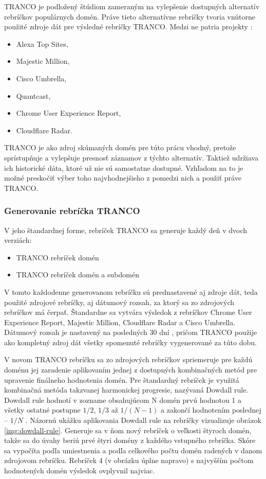 TRANCO je podložený štúdiom zameraným na vylepšenie dostupných alternatív rebríčkov populárnych domén.
Práve tieto alternatívne rebríčky tvoria vnútorne použité zdroje dát pre výsledné rebríčky TRANCO.
Medzi ne patria projekty \cite{tranco-config}:
\begin{itemize}
    \item Alexa Top Sites,
    \item Majestic Million,
    \item Cisco Umbrella,
    \item Quantcast,
    \item Chrome User Experience Report,
    \item Cloudflare Radar.
\end{itemize}
TRANCO je ako zdroj skúmaných domén pre túto prácu vhodný, pretože sprístupňuje a vylepšuje presnosť záznamov z týchto alternatív.
Taktiež udržiava ich historické dáta, ktoré už nie sú samostatne dostupné.
Vzhľadom na to je možné preskočiť výber toho najvhodnejšieho z pomedzi nich a použiť práve TRANCO.

\subsubsection{Generovanie rebríčka TRANCO}
\label{tranco-generation}

V jeho štandardnej forme, rebríček TRANCO sa generuje každý deň v dvoch verziách:
\begin{itemize}
    \item TRANCO rebríček domén
    \item TRANCO rebríček domén a subdomén
\end{itemize}

V tomto každodenne generovanom rebríčku sú prednastavené aj zdroje dát, teda použité zdrojové rebríčky, aj dátumový rozsah, za ktorý sa zo zdrojových rebríčkov má čerpať.
Štandardne sa vytvára výsledok z rebríčkov Chrome User Experience Report, Majestic Million, Cloudflare Radar a Cisco Umbrella.
Dátumový rozsah je nastavený na posledných 30 dní \cite{tranco-config}, pričom TRANCO použije ako kompletný zdroj dát všetky spomenuté rebríčky vygenerované za túto dobu. 

V novom TRANCO rebríčku sa zo zdrojových rebríčkov spriemeruje pre každú doménu jej zaradenie aplikovaním jednej z dostupných kombinačných metód pre upravenie finálneho hodnotenia domén.
Pre štandardný rebríček je využitá kombinačná metóda takzvanej harmonickej progresie, nazývaná Dowdall rule. 
Dowdall rule hodnotí v zozname obsahujúcom N domén prvú hodnotou 1 a všetky ostatné postupne \(1/2\), \(1/3\) až \(1/(N-1)\) a zakončí hodnotením poslednej -- \(1/N\) \cite{tranco, tranco-config}.
Názornú ukážku aplikovania Dowdall rule na rebríčky vizualizuje obrázok \ref{img:dowdall-rule}.
Generuje sa v ňom nový rebríček o veľkosti štyroch domén, takže sa do úvahy beriú prvé štyri domény z každého vstupného rebríčka. 
Skóre sa vypočíta podľa umiestnenia a podľa celkového počtu domén radených v danom zdrojovom rebríčku. 
Rebríček 4 (v obrázku úplne napravo) s najvyšším počtom hodnotených domén výsledok ovplyvnil najviac.

